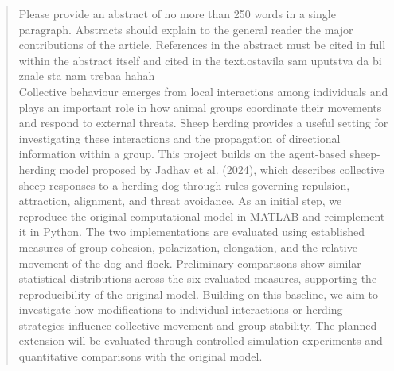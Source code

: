 \documentclass[9pt,twoside]{pnas-new}
\begin{document}
\begin{abstract}
Please provide an abstract of no more than 250 words in a single paragraph. Abstracts should explain to the general reader the major contributions of the article. References in the abstract must be cited in full within the abstract itself and cited in the text.ostavila sam uputstva da bi znale sta nam trebaa hahah
\\


Collective behaviour emerges from local interactions among individuals and plays an important role in how animal groups coordinate their movements and respond to external threats. Sheep herding provides a useful setting for investigating these interactions and the propagation of directional information within a group. This project builds on the agent-based sheep-herding model proposed by Jadhav et al. (2024), which describes collective sheep responses to a herding dog through rules governing repulsion, attraction, alignment, and threat avoidance. As an initial step, we reproduce the original computational model in MATLAB and reimplement it in Python. The two implementations are evaluated using established measures of group cohesion, polarization, elongation, and the relative movement of the dog and flock. Preliminary comparisons show similar statistical distributions across the six evaluated measures, supporting the reproducibility of the original model. Building on this baseline, we aim to investigate how modifications to individual interactions or herding strategies influence collective movement and group stability. The planned extension will be evaluated through controlled simulation experiments and quantitative comparisons with the original model.
\end{abstract}


\maketitle
\thispagestyle{firststyle}


\Firstpage

\end{document}
